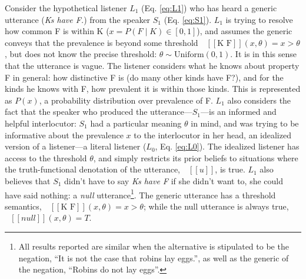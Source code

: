 \documentclass[10pt,letterpaper]{article}
\newcommand{\denote}[1]{\mbox{ $[\![ #1 ]\!]$}}
\newcommand{\ndg}[1]{\textcolor{Green}{[ndg: #1]}}
\newcommand{\mht}[1]{\textcolor{Blue}{[mht: #1]}}
\begin{document}

Consider the hypothetical listener $L_{1}$ (Eq. \ref{eq:L1}) who has heard a generic utterance (\emph{Ks have F.}) from the speaker $S_{1}$ (Eq. \ref{eq:S1}). 
$L_1$ is trying to resolve how common F is within K ($x = P(F\mid K) \in [0, 1]$), and assumes the generic conveys that the prevalence is beyond some threshold $\denote{\text{K F}}(x, \theta)=x>\theta$, but does not know the precise threshold: $\theta \sim \text{Uniform}(0,1)$.
It is in this sense that the utterance is vague.
The listener considers what he knows about property F in general: how distinctive F is (do many other kinds have F?), and for the kinds he knows with F, how prevalent it is within those kinds.
This is represented as $P(x)$, a probability distribution over prevalence of F.
$L_1$ also considers the fact that the speaker who produced the utterance---$S_1$---is an informed and helpful interlocutor: $S_1$ had a particular meaning $\theta$ in mind, and was trying to be informative about the prevalence $x$ to the interlocutor in her head, an idealized version of a listener---a literal listener ($L_{0}$, Eq. \ref{eq:L0}).
The idealized listener has access to the threshold $\theta$, and simply restricts its prior beliefs to situations where the truth-functional denotation of the utterance, $\denote{u}$, is true.
$L_1$ also believes that $S_1$ didn't have to say \emph{Ks have F} if she didn't want to, she could have said nothing: a \emph{null} utterance\footnote{All results reported are similar when the alternative is stipulated to be the negation,  ``It is not the case that robins lay eggs.'', as well as the generic of the negation, ``Robins do not lay eggs''.}. 
The generic utterance has a threshold semantics, $\denote{\text{K F}}(x, \theta)=x>\theta$; while the null utterance is always true, $\denote{null}(x, \theta)=T$.
\end{document}
